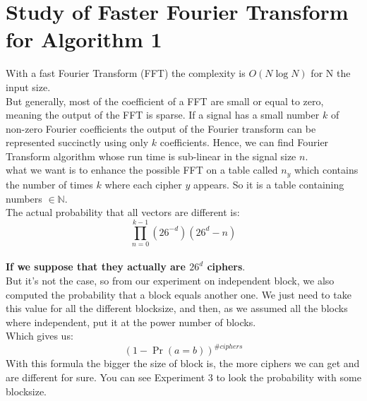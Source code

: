 \documentclass{article}
\begin{document}
\section{Study of Faster Fourier Transform for Algorithm 1}
With a fast Fourier Transform (FFT) the complexity is $O(N\log N)$ for N the input size.\\
But generally, most of the coefficient of a FFT are small or equal to zero, meaning the output of the FFT is sparse. If a signal has a small number $k$ of non-zero Fourier coefficients the output of the Fourier transform can be represented succinctly using only $k$ coefficients. Hence, we can find Fourier Transform algorithm whose run time is sub-linear in the signal size $n$.\\
what we want is to enhance the possible FFT on a table called $n_y$ which contains the number of times $k$ where each cipher $y$ appears. So it is a table containing numbers $\in \mathbb{N}$.\\
The actual probability that all vectors are different is:
$$\prod_{n=0}^{k-1}{(26^{-d})(26^d -n)}$$\\
\textbf{If we suppose that they actually are $26^d$ ciphers}.\\
But it's not the case, so from our experiment on independent block, we also computed the probability that a block equals another one. We just need to take this value for all the different blocksize, and then, as we assumed all the blocks where independent, put it at the power number of blocks.\\
Which gives us:
$$(1-\Pr(a=b))^{\#ciphers}$$
With this formula the bigger the size of block is, the more ciphers we can get and are different for sure. You can see Experiment 3 to look the probability with some blocksize.\\
\end{document}
